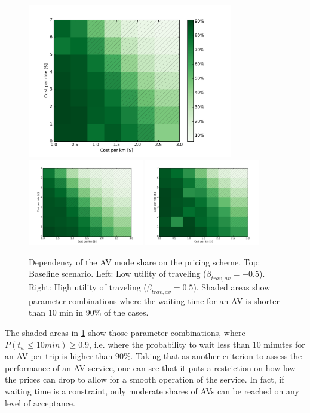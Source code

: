 \begin{figure}
    \centering
    \includegraphics[width=0.8\textwidth]{figures/sharegrid.pdf}
    \includegraphics[width=0.45\textwidth]{figures/sharegrid_n05.pdf}
    \includegraphics[width=0.45\textwidth]{figures/sharegrid_p05.pdf}
    \caption{Dependency of the AV mode share on the pricing scheme. Top: Baseline
    scenario. Left: Low utility of traveling ($\beta_{trav,av} = -0.5$). Right: High utility
    of traveling ($\beta_{trav,av} = 0.5$). Shaded areas show parameter combinations
    where the waiting time for an AV is shorter than 10 min in 90\% of the cases.}
    \label{fig:sharegrid}
\end{figure}

The shaded areas in \cref{fig:sharegrid} show those parameter combinations, where
$P(t_w \leq 10min) \geq 0.9$, i.e. where the probability to wait less than 10
minutes for an AV per trip is higher than 90\%. Taking that as another criterion
to assess the performance of an AV service, one can see that it puts a restriction
on how low the prices can drop to allow for a smooth operation of the
service. In fact, if waiting time is a constraint, only moderate shares of AVs
can be reached on any level of acceptance.


